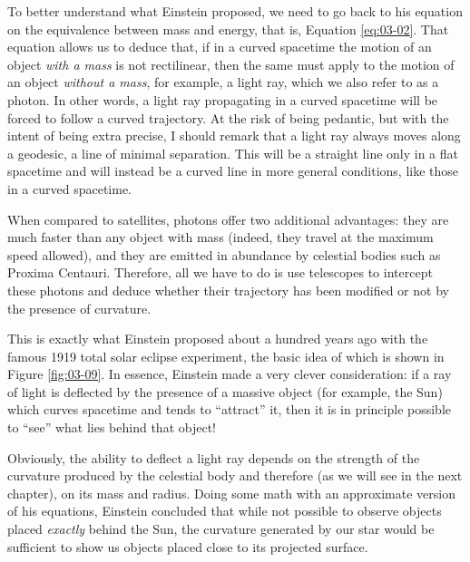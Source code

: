 To better understand what Einstein proposed, we need to go back to his equation on the
equivalence between mass and energy, that is, Equation \eqref{eq:03-02}. That equation allows us to
deduce that, if in a curved spacetime the motion of an object \emph{with a mass} is not
rectilinear, then the same must apply to the motion of an object \emph{without a mass},
for example, a light ray, which we also refer to as a photon. In
other words, a light ray propagating in a curved spacetime will be forced to follow a
curved trajectory. At the risk of being pedantic, but with the intent of being extra
precise, I should remark that a light ray always moves along a
geodesic, a line of minimal separation. This will be a straight line
only in a flat spacetime and will instead be a curved line in more general conditions,
like those in a curved spacetime.

When compared to satellites, photons offer two additional advantages: they are much
faster than any object with mass (indeed, they travel at the maximum speed allowed), and
they are emitted in abundance by celestial bodies such as Proxima
Centauri. Therefore, all we have to do is use telescopes to
intercept these photons and deduce whether their trajectory has been modified or not by
the presence of curvature.

This is exactly what Einstein proposed about a hundred years ago with the famous 1919
total solar eclipse experiment, the basic idea of which is shown in Figure \ref{fig:03-09}. In
essence, Einstein made a very clever consideration: if a ray of light is deflected by
the presence of a massive object (for example, the
Sun) which curves spacetime and tends to
``attract'' it, then it is in principle possible to ``see'' what lies behind that
object!

Obviously, the ability to deflect a light ray depends on the strength of the curvature
produced by the celestial body and therefore (as we will see in the next chapter), on
its mass and radius. Doing some math with an approximate version of his equations,
Einstein concluded that while not possible to observe objects placed \emph{exactly}
behind the Sun, the curvature generated by our star would be sufficient to show us
objects placed close to its projected surface.

